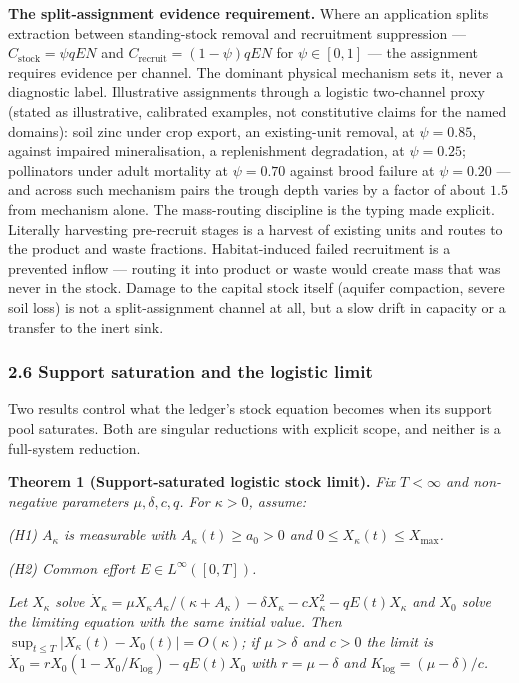\documentclass[11pt]{article}
\begin{document}
\textbf{The split-assignment evidence requirement.} Where an application
splits extraction between standing-stock removal and recruitment
suppression --- \(C_{\mathrm{stock}} = \psi qEN\) and
\(C_{\mathrm{recruit}} = (1-\psi)qEN\) for \(\psi \in [0,1]\) --- the
assignment requires evidence per channel. The dominant physical
mechanism sets it, never a diagnostic label. Illustrative assignments
through a logistic two-channel proxy (stated as illustrative, calibrated
examples, not constitutive claims for the named domains): soil zinc
under crop export, an existing-unit removal, at \(\psi = 0.85\), against
impaired mineralisation, a replenishment degradation, at
\(\psi = 0.25\); pollinators under adult mortality at \(\psi = 0.70\)
against brood failure at \(\psi = 0.20\) --- and across such mechanism
pairs the trough depth varies by a factor of about \(1.5\) from
mechanism alone. The mass-routing discipline is the typing made
explicit. Literally harvesting pre-recruit stages is a harvest of
existing units and routes to the product and waste fractions.
Habitat-induced failed recruitment is a prevented inflow --- routing it
into product or waste would create mass that was never in the stock.
Damage to the capital stock itself (aquifer compaction, severe soil
loss) is not a split-assignment channel at all, but a slow drift in
capacity or a transfer to the inert sink.

\subsubsection{2.6 Support saturation and the logistic
limit}\label{support-saturation-and-the-logistic-limit}

Two results control what the ledger's stock equation becomes when its
support pool saturates. Both are singular reductions with explicit
scope, and neither is a full-system reduction.

\textbf{Theorem 1 (Support-saturated logistic stock limit).} \emph{Fix
\(T < \infty\) and non-negative parameters \(\mu, \delta, c, q\). For
\(\kappa > 0\), assume:}

\emph{(H1) \(A_\kappa\) is measurable with \(A_\kappa(t) \ge a_0 > 0\)
and \(0 \le X_\kappa(t) \le X_{\max}\).}

\emph{(H2) Common effort \(E \in L^\infty([0,T])\).}

\emph{Let \(X_\kappa\) solve
\(\dot X_\kappa = \mu X_\kappa A_\kappa/(\kappa + A_\kappa) - \delta X_\kappa - cX_\kappa^2 - qE(t)X_\kappa\)
and \(X_0\) solve the limiting equation with the same initial value.
Then \(\sup_{t \le T} |X_\kappa(t) - X_0(t)| = O(\kappa)\); if
\(\mu > \delta\) and \(c > 0\) the limit is
\(\dot X_0 = rX_0(1 - X_0/\allowbreak{}K_{\log}) - qE(t)X_0\) with
\(r = \mu - \delta\) and \(K_{\log} = (\mu - \delta)/c\).}
\end{document}
